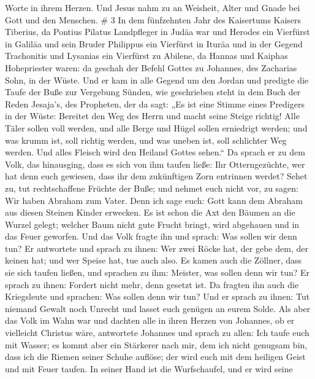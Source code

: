 Worte in ihrem Herzen.  Und Jesus nahm zu an Weisheit,
Alter und Gnade bei Gott und den Menschen. \# 3  In dem
fünfzehnten Jahr des Kaisertums Kaisers Tiberius, da Pontius Pilatus
Landpfleger in Judäa war und Herodes ein Vierfürst in Galiläa und sein
Bruder Philippus ein Vierfürst in Ituräa und in der Gegend Trachonitis
und Lysanias ein Vierfürst zu Abilene,  da Hannas und
Kaiphas Hohepriester waren: da geschah der Befehl Gottes zu Johannes,
des Zacharias Sohn, in der Wüste.  Und er kam in alle Gegend
um den Jordan und predigte die Taufe der Buße zur Vergebung Sünden,
 wie geschrieben steht in dem Buch der Reden Jesaja's, des
Propheten, der da sagt: „Es ist eine Stimme eines Predigers in der
Wüste: Bereitet den Weg des Herrn und macht seine Steige richtig!
 Alle Täler sollen voll werden, und alle Berge und Hügel
sollen erniedrigt werden; und was krumm ist, soll richtig werden, und
was uneben ist, soll schlichter Weg werden.  Und alles
Fleisch wird den Heiland Gottes sehen.``  Da sprach er zu
dem Volk, das hinausging, dass es sich von ihm taufen ließe: Ihr
Otterngezüchte, wer hat denn euch gewiesen, dass ihr dem zukünftigen
Zorn entrinnen werdet?  Sehet zu, tut rechtschaffene Früchte
der Buße; und nehmet euch nicht vor, zu sagen: Wir haben Abraham zum
Vater. Denn ich sage euch: Gott kann dem Abraham aus diesen Steinen
Kinder erwecken.  Es ist schon die Axt den Bäumen an die
Wurzel gelegt; welcher Baum nicht gute Frucht bringt, wird abgehauen und
in das Feuer geworfen.  Und das Volk fragte ihn und sprach:
Was sollen wir denn tun?  Er antwortete und sprach zu
ihnen: Wer zwei Röcke hat, der gebe dem, der keinen hat; und wer Speise
hat, tue auch also.  Es kamen auch die Zöllner, dass sie
sich taufen ließen, und sprachen zu ihm: Meister, was sollen denn wir
tun?  Er sprach zu ihnen: Fordert nicht mehr, denn gesetzt
ist.  Da fragten ihn auch die Kriegsleute und sprachen: Was
sollen denn wir tun? Und er sprach zu ihnen: Tut niemand Gewalt noch
Unrecht und lasset euch genügen an eurem Solde.  Als aber
das Volk im Wahn war und dachten alle in ihren Herzen von Johannes, ob
er vielleicht Christus wäre,  antwortete Johannes und
sprach zu allen: Ich taufe euch mit Wasser; es kommt aber ein Stärkerer
nach mir, dem ich nicht genugsam bin, dass ich die Riemen seiner Schuhe
auflöse; der wird euch mit dem heiligen Geist und mit Feuer taufen.
 In seiner Hand ist die Wurfschaufel, und er wird seine
